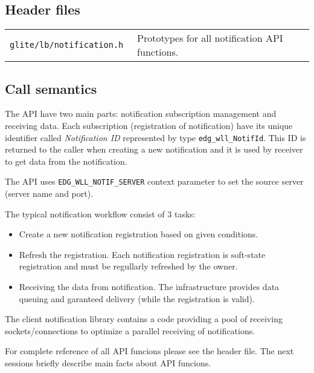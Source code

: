\subsection{Header files}
\begin{table}[h]
\begin{tabularx}{\textwidth}{>{\tt}lX}
glite/lb/notification.h & Prototypes for all notification API functions. \\
\end{tabularx}
\end{table}

\subsection{Call semantics}
The API have two main parts: notification subscription management and
receiving data. Each subscription (registration of notification) have
its unique identifier called \emph{Notification ID} represented by
type \verb'edg_wll_NotifId'. This ID is returned to the caller when
creating a new notification and it is used by receiver to get data
from the notification.

The API uses \verb'EDG_WLL_NOTIF_SERVER' context parameter to set the
source server (\LB server name and port). 

The typical notification workflow consist of 3 tasks:
\begin{itemize}
 \item Create a new notification registration based on given conditions.
 \item Refresh the registration. Each notification registration is
  soft-state registration and must be regullarly refreshed by the
  owner.
 \item Receiving the data from notification. The \LB infrastructure
  provides data queuing and garanteed delivery (while the registration
  is valid). 
\end{itemize}

The client notification library contains a code providing a pool of
receiving sockets/connections to optimize a parallel receiving of
notifications.

For complete reference of all API funcions please see the header
file. The next sessions briefly describe main facts about API
funcions.

